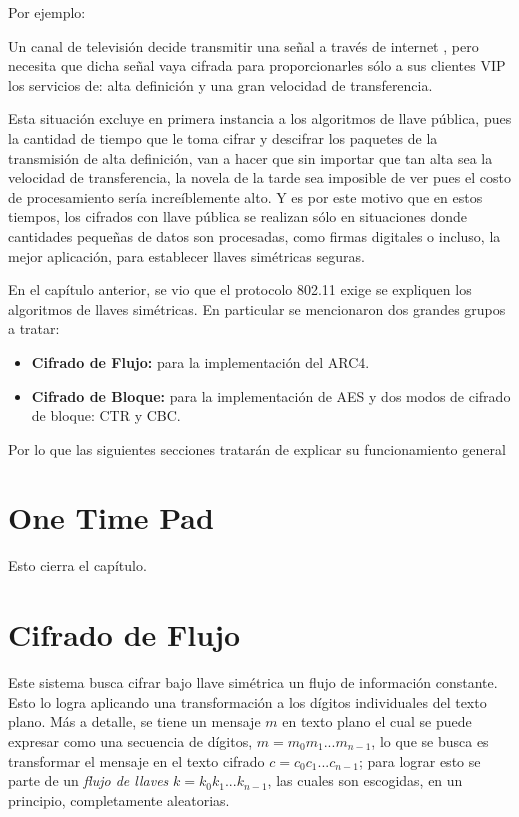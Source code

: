 Por ejemplo: 

Un canal de televisión decide transmitir una señal a través de internet , pero necesita que dicha señal vaya cifrada para proporcionarles sólo a sus clientes VIP los servicios de: alta definición y una gran velocidad de transferencia.

Esta situación excluye en primera instancia a los algoritmos de llave pública, pues la cantidad de tiempo que le toma cifrar y descifrar los paquetes de la transmisión de alta definición, van a hacer que sin importar que tan alta sea la velocidad de transferencia, la novela de la tarde sea imposible de ver pues el costo de procesamiento sería increíblemente alto. Y es por este motivo que en estos tiempos, los cifrados con llave pública se realizan sólo en situaciones donde cantidades pequeñas de datos son procesadas, como firmas digitales o incluso, la mejor aplicación, para establecer llaves simétricas  seguras.

En el capítulo anterior, se vio que el protocolo 802.11 exige se expliquen los algoritmos de llaves simétricas. En particular se mencionaron dos grandes grupos a tratar:
\begin{itemize}
	\item {\bf Cifrado de Flujo:} para la implementación del ARC4.
	\item {\bf Cifrado de Bloque:} para la implementación de AES y dos modos de cifrado de bloque: CTR y CBC.
\end{itemize}
Por lo que las siguientes secciones tratarán de explicar su funcionamiento general


\section{One Time Pad}
Esto cierra el capítulo.



\section{Cifrado de Flujo} 

Este sistema busca cifrar bajo llave simétrica un flujo de información constante. Esto lo logra aplicando una transformación a los dígitos individuales del texto plano. 
Más a detalle, se tiene un mensaje $m$ en texto plano el cual se puede expresar como una secuencia de dígitos, $m = m_0 m_1...m_{n-1}$,  lo que se busca es transformar el mensaje en el texto cifrado $c = c_0c_1...c_{n-1}$; para lograr esto se parte de un \emph{flujo de llaves} $k = k_0k_1...k_{n-1}$, las cuales son escogidas, en un principio, completamente aleatorias.

